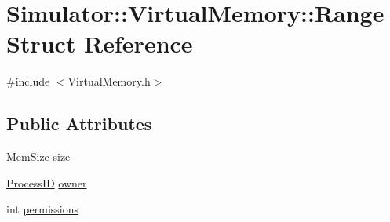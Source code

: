 \hypertarget{struct_simulator_1_1_virtual_memory_1_1_range}{\section{Simulator\+:\+:Virtual\+Memory\+:\+:Range Struct Reference}
\label{struct_simulator_1_1_virtual_memory_1_1_range}
}


{\ttfamily \#include $<$Virtual\+Memory.\+h$>$}

\subsection*{Public Attributes}
\begin{DoxyCompactItemize}
\item 
Mem\+Size \hyperlink{struct_simulator_1_1_virtual_memory_1_1_range_afc3153d6fb01169307afebb8b36d021f}{size}
\item 
\hyperlink{namespace_simulator_a62ef2d2c77bd54a16c39881f6266875e}{Process\+I\+D} \hyperlink{struct_simulator_1_1_virtual_memory_1_1_range_a26a903ca1cb0e4f2db8c16e1ee7b5ff2}{owner}
\item 
int \hyperlink{struct_simulator_1_1_virtual_memory_1_1_range_a5caf51ae0100604342e9080504893135}{permissions}
\end{DoxyCompactItemize}


